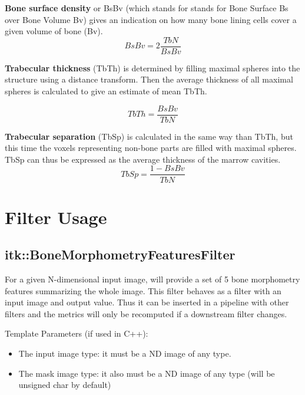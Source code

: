 \documentclass{InsightArticle}
\begin{document}
\textbf{Bone surface density} or BsBv (which stands for  stands for Bone Surface Bs over Bone Volume Bv) gives an indication on how many bone lining cells cover a given volume of bone (Bv).
\begin{equation} \label{eqn:BsBv}
BsBv = 2 \frac{TbN}{BsBv}
\end{equation}

\textbf{Trabecular thickness} (TbTh) is determined by filling maximal spheres into the structure using a distance transform. Then the average thickness of all maximal spheres is calculated to give an estimate of mean TbTh.

\begin{equation} \label{eqn:TbTh} 
TbTh = \frac{BsBv}{TbN}
\end{equation}

\textbf{Trabecular separation} (TbSp) is calculated in the same way than TbTh, but this time the voxels representing non-bone parts are filled with maximal spheres. TbSp can thus be expressed as the average thickness of the marrow cavities. 
\begin{equation} \label{eqn:TbSp}
TbSp = \frac{1 - BsBv}{TbN}
\end{equation}

\newpage
\section{Filter Usage}
\label{sec:filterUsage}

\subsection{itk::BoneMorphometryFeaturesFilter}
\label{sec:BMFilter}

For a given N-dimensional input image,  will provide a set of 5 bone morphometry features summarizing the whole image. This filter behaves as a filter with an input image and output value. Thus it can be inserted in a pipeline with other filters and the metrics will only be recomputed if a downstream filter changes.

Template Parameters (if used in C++):
\begin{itemize}
 \item The input image type: it must be a ND image of any type.
 \item The mask image type: it also must be a ND image of any type (will be unsigned char by default)
\end{itemize}
\end{document}
